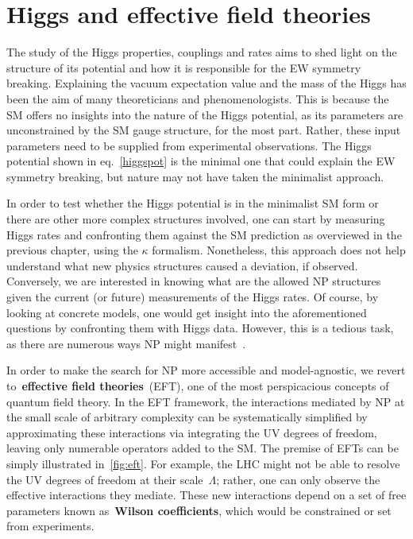 \chapter{Higgs and effective field theories }\label{chap:HiggsEFT}
\par The study of the Higgs properties, couplings and rates aims to shed light on the structure of its potential and how it is responsible for the EW symmetry breaking. Explaining the vacuum expectation value and the mass of the Higgs has been the aim of many theoreticians and phenomenologists. This is because the SM offers no insights into the nature of the Higgs potential, as its parameters are unconstrained by the SM gauge structure, for the most part.  Rather, these input parameters need to be supplied from experimental observations. The Higgs potential shown in eq.~\eqref{higgspot} is the minimal one that could explain the EW symmetry breaking, but nature may not have taken the minimalist approach. 
\par  In order to test whether the Higgs potential is in the minimalist SM form or there are other more complex structures involved, one can start by measuring Higgs rates and confronting them against the SM prediction as overviewed in the previous chapter, using the $\kappa$ formalism.  Nonetheless, this approach does not help understand what  new physics structures caused a deviation, if observed. Conversely, we are interested in knowing what are the allowed NP structures given the current (or future) measurements of the Higgs rates.  Of course, by looking at concrete models, one would get insight into the aforementioned questions by confronting them with Higgs data. However, this is a tedious task, as there are numerous ways NP might manifest~. 
\par In order to make the search for NP more accessible and model-agnostic, we revert to~\textbf{effective field theories}~(EFT), one of the most perspicacious concepts of quantum field theory. In the EFT framework, the interactions mediated by NP at the small scale of arbitrary complexity can be systematically simplified by approximating these interactions via integrating the UV degrees of freedom, leaving only numerable operators added to the SM. The premise of EFTs can be simply illustrated in~\autoref{fig:eft}.  For example, the LHC might not be able to resolve the UV degrees of freedom at their scale~$\Lambda$; rather, one can only observe the effective interactions they mediate. These new interactions depend on a set of free parameters known as~\textbf{Wilson coefficients}, which would be constrained or set from experiments. 
